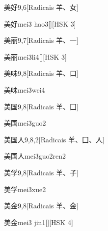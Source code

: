 \begin{entry}{美好}{9,6}[Radicais ⽺、⼥]
  \begin{phonetics}{美好}{mei3 hao3}[][HSK 3]
  \end{phonetics}
\end{entry}

\begin{entry}{美丽}{9,7}[Radicais ⽺、⼀]
  \begin{phonetics}{美丽}{mei3li4}[][HSK 3]
  \end{phonetics}
\end{entry}

\begin{entry}{美味}{9,8}[Radicais ⽺、⼝]
  \begin{phonetics}{美味}{mei3wei4}
  \end{phonetics}
\end{entry}

\begin{entry}{美国}{9,8}[Radicais ⽺、⼞]
  \begin{phonetics}{美国}{mei3guo2}
  \end{phonetics}
\end{entry}

\begin{entry}{美国人}{9,8,2}[Radicais ⽺、⼞、⼈]
  \begin{phonetics}{美国人}{mei3guo2ren2}
  \end{phonetics}
\end{entry}

\begin{entry}{美学}{9,8}[Radicais ⽺、⼦]
  \begin{phonetics}{美学}{mei3xue2}
  \end{phonetics}
\end{entry}

\begin{entry}{美金}{9,8}[Radicais ⽺、⾦]
  \begin{phonetics}{美金}{mei3 jin1}[][HSK 4]
  \end{phonetics}
\end{entry}

